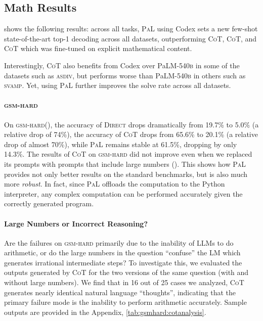 \documentclass[dvipsnames]{article} \usepackage[accepted]{icml2022}
\newcommand{\ours}{\textsc{PaL}\xspace}
\newcommand{\cotp}{\textsc{CoT}\xspace}
\newcommand{\direct}{\textsc{Direct}\xspace}
\newcommand{\llm}{LLM\xspace}
\newcommand{\gsmhard}{\textsc{gsm-hard}\xspace}
\newcommand{\asdiv}{\textsc{asdiv}\xspace}
\newcommand{\svamp}{\textsc{svamp}\xspace}
\newcommand{\largepalm}{\textsc{P}a\textsc{LM}\textsc{-540b}\xspace}
\begin{document}
\subsection{Math Results}\label{sec:math_result}  shows the following results: across all tasks,  \ours using Codex sets a new few-shot state-of-the-art top-1 decoding across all datasets,
outperforming \cotp{}, \cotp{}, and \cotp{} which was fine-tuned on explicit mathematical content.

Interestingly, \cotp also benefits from Codex over \largepalm in some of the datasets such as \asdiv, but performs worse than \largepalm in others such as \svamp. Yet, using \ours further improves the solve rate across all datasets.

\paragraph{\gsmhard}
On \gsmhard (), 
the accuracy of \direct drops dramatically from 19.7\% to 5.0\% (a relative drop of 74\%),
the accuracy of \cotp drops from 65.6\% to 20.1\% (a relative drop of almost 70\%), while  \ours remains stable at 61.5\%, dropping by only 14.3\%. 
The results of \cotp on \gsmhard did not improve even when we replaced its prompts with prompts that include large numbers ().
This shows how \ours provides not only better results on the standard benchmarks, but 
is also much more \emph{robust}.
In fact, since \ours offloads the computation to the Python interpreter, 
 any complex computation can be performed accurately given the correctly generated program.


\paragraph{Large Numbers or Incorrect Reasoning?}
Are the failures on \gsmhard primarily due to the inability of \llm{}s to do arithmetic, or do the large numbers in the question ``confuse'' the LM which generates irrational intermediate steps?
To investigate this, we evaluated the outputs generated by \cotp for the two versions of the same question (with and without large numbers). We find that in 16 out of 25 cases we analyzed, \cotp generates nearly identical natural language ``thoughts'', indicating that the primary failure mode is the inability to perform arithmetic accurately. Sample outputs are provided in the Appendix, \autoref{tab:gsmhard:cotanalysis}. 
\end{document}
